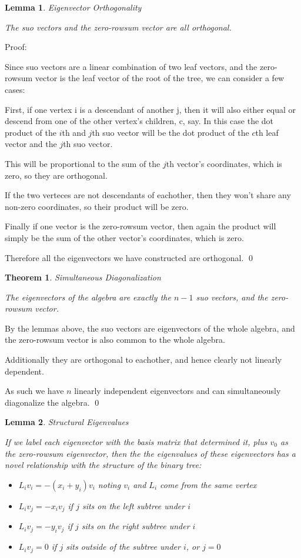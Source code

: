 \documentclass[10pt,a4paper]{report}
\newtheorem{theorem}{Theorem}
\newtheorem{lemma}{Lemma}
\begin{document}
\begin{lemma} Eigenvector Orthogonality

	The suo vectors and the zero-rowsum vector are all orthogonal.
\end{lemma}

Proof:

Since suo vectors are a linear combination of two leaf vectors, and the
zero-rowsum vector is the leaf vector of the root of the tree, we can consider
a few cases:

First, if one vertex i is a descendant of another j, then it will also either
equal or descend from one of the other vertex's children, c, say.  In this case
the dot product of the $i$th and $j$th suo vector will be the dot product of
the $c$th leaf vector and the $j$th suo vector.

This will be proportional to the sum of the $j$th vector's coordinates, which
is zero, so they are orthogonal.

If the two verteces are not descendants of eachother, then they won't share any
non-zero coordinates, so their product will be zero.

Finally if one vector is the zero-rowsum vector, then again the product will
simply be the sum of the other vector's coordinates, which is zero.

Therefore all the eigenvectors we have constructed are orthogonal. \qed

\begin{theorem} Simultaneous Diagonalization

	The eigenvectors of the algebra are exactly the $n-1$ suo vectors, and the
	zero-rowsum vector.
\end{theorem}

By the lemmas above, the suo vectors are eigenvectors of the whole algebra, and
the zero-rowsum vector is also common to the whole algebra.

Additionally they are orthogonal to eachother, and hence clearly not linearly
dependent.

As such we have $n$ linearly independent eigenvectors and can simultaneously
diagonalize the algebra. \qed

\begin{lemma} Structural Eigenvalues

	If we label each eigenvector with the basis matrix that determined it, plus
	$v_0$ as the zero-rowsum eigenvector, then the the eigenvalues of these
	eigenvectors has a novel relationship with the structure of the binary
	tree:
	\begin{itemize}
		\item ${L_i}{v_i} = -(x_i + y_i)v_i$ noting $v_i$ and $L_i$ come from
			the same vertex
		\item ${L_i}{v_j} = -{x_i}{v_j}$ if $j$ sits on the left subtree under
			$i$
		\item ${L_i}{v_j} = -{y_i}{v_j}$ if $j$ sits on the right subtree under
			$i$
		\item ${L_i}{v_j} = 0$ if $j$ sits outside of the subtree under $i$, or
			$j=0$
	\end{itemize}
\end{lemma}
\end{document}
